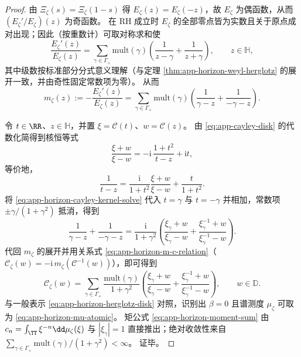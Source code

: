 \begin{proof}
由 \(\Xi_{\zeta}(s)=\Xi_{\zeta}(1-s)\) 得 \(E_{\zeta}(z)=E_{\zeta}(-z)\)，故 \(E_{\zeta}\) 为偶函数，从而 \((E_{\zeta}'/E_{\zeta})(z)\) 为奇函数。
在 RH 成立时 \(E_{\zeta}\) 的全部零点皆为实数且关于原点成对出现；因此（按重数计）可取对称求和使
\begin{equation}\label{eq:app-horizon-Elog-odd-pf}
\frac{E_{\zeta}'(z)}{E_{\zeta}(z)}
=
\sum_{\gamma\in\Gamma_+}\mathrm{mult}(\gamma)\!\left(\frac{1}{z-\gamma}+\frac{1}{z+\gamma}\right),
\qquad z\in\mathbb{H},
\end{equation}
其中级数按标准部分分式意义理解（与定理 \ref{thm:app-horizon-weyl-herglotz} 的展开一致，并由奇性固定常数项为零）。
从而
\[
m_{\zeta}(z):=-\frac{E_{\zeta}'(z)}{E_{\zeta}(z)}
=
\sum_{\gamma\in\Gamma_+}\mathrm{mult}(\gamma)\!\left(\frac{1}{\gamma-z}+\frac{1}{-\gamma-z}\right).
\]

令 \(t\in\RR\)、\(z\in\mathbb{H}\)，并置 \(\xi=\mathcal{C}(t)\)、\(w=\mathcal{C}(z)\)。
由 \eqref{eq:app-cayley-disk} 的代数化简得到核恒等式
\begin{equation}\label{eq:app-horizon-cayley-kernel-identity}
\frac{\xi+w}{\xi-w}
=-\mathrm{i}\,\frac{1+t^{2}}{t-z}+\mathrm{i}t,
\end{equation}
等价地，
\begin{equation}\label{eq:app-horizon-cayley-kernel-solve}
\frac{1}{t-z}
=\frac{\mathrm{i}}{1+t^{2}}\frac{\xi+w}{\xi-w}+\frac{t}{1+t^{2}}.
\end{equation}
将 \eqref{eq:app-horizon-cayley-kernel-solve} 代入 \(t=\gamma\) 与 \(t=-\gamma\) 并相加，常数项 \(\pm\gamma/(1+\gamma^2)\) 抵消，得到
\[
\frac{1}{\gamma-z}+\frac{1}{-\gamma-z}
=\frac{\mathrm{i}}{1+\gamma^{2}}
\left(
\frac{\xi_{\gamma}+w}{\xi_{\gamma}-w}
+
\frac{\xi_{\gamma}^{-1}+w}{\xi_{\gamma}^{-1}-w}
\right).
\]
代回 \(m_{\zeta}\) 的展开并用关系式 \eqref{eq:app-horizon-m-c-relation}（\(\mathscr{C}_{\zeta}(w)=-\mathrm{i}\,m_{\zeta}(\mathcal{C}^{-1}(w))\)），即可得到
\[
\mathscr{C}_{\zeta}(w)
=
\sum_{\gamma\in\Gamma_+}\frac{\mathrm{mult}(\gamma)}{1+\gamma^2}
\left(
\frac{\xi_{\gamma}+w}{\xi_{\gamma}-w}
+
\frac{\xi_{\gamma}^{-1}+w}{\xi_{\gamma}^{-1}-w}
\right),
\qquad w\in\mathbb{D}.
\]
与一般表示 \eqref{eq:app-horizon-herglotz-disk} 对照，识别出 \(\beta=0\) 且谱测度 \(\mu_{\zeta}\) 可取为 \eqref{eq:app-horizon-mu-atomic}。
矩公式 \eqref{eq:app-horizon-moment-sum} 由 \(c_n=\int_{\TT}\xi^{-n}\dd\mu_{\zeta}(\xi)\) 与 \(|\xi_{\gamma}|=1\) 直接推出；绝对收敛性来自 \(\sum_{\gamma\in\Gamma_+}\mathrm{mult}(\gamma)/(1+\gamma^2)<\infty\)。
证毕。
\end{proof}

